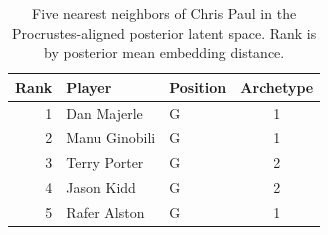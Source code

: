 \begin{table}[htbp]
  \centering\small
  \begin{tabular}{rllc}
    \toprule
    Rank & Player & Position & Archetype \\
    \midrule
    1 & Dan Majerle & G & 1 \\
    2 & Manu Ginobili & G & 1 \\
    3 & Terry Porter & G & 2 \\
    4 & Jason Kidd & G & 2 \\
    5 & Rafer Alston & G & 1 \\
    \bottomrule
  \end{tabular}
  \caption{Five nearest neighbors of Chris Paul in the Procrustes-aligned posterior latent space. Rank is by posterior mean embedding distance.}
  \label{tab:Chris_Paul_neighbors}
\end{table}

